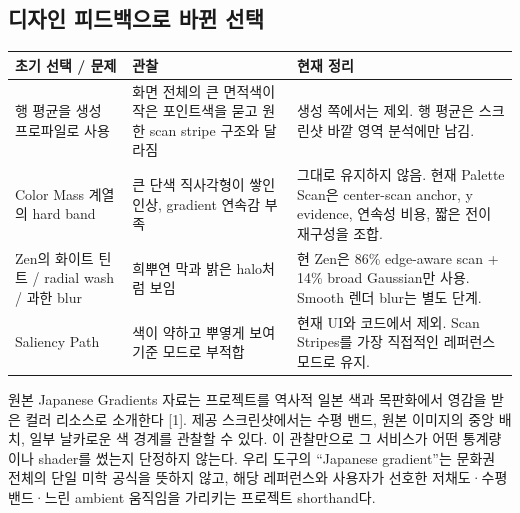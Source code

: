 \documentclass[10pt]{article}
\begin{document}
\subsection*{디자인 피드백으로 바뀐 선택}
\begin{tabularx}{\linewidth}{@{}p{2.9cm}YY@{}}
\toprule
초기 선택 / 문제 & 관찰 & 현재 정리 \\
\midrule
행 평균을 생성 프로파일로 사용 & 화면 전체의 큰 면적색이 작은 포인트색을 묻고 원한 scan stripe 구조와 달라짐 & 생성 쪽에서는 제외. 행 평균은 스크린샷 바깥 영역 분석에만 남김. \\
Color Mass 계열의 hard band & 큰 단색 직사각형이 쌓인 인상, gradient 연속감 부족 & 그대로 유지하지 않음. 현재 Palette Scan은 center-scan anchor, y evidence, 연속성 비용, 짧은 전이 재구성을 조합. \\
Zen의 화이트 틴트 / radial wash / 과한 blur & 희뿌연 막과 밝은 halo처럼 보임 & 현 Zen은 86\% edge-aware scan + 14\% broad Gaussian만 사용. Smooth 렌더 blur는 별도 단계. \\
Saliency Path & 색이 약하고 뿌옇게 보여 기준 모드로 부적합 & 현재 UI와 코드에서 제외. Scan Stripes를 가장 직접적인 레퍼런스 모드로 유지. \\
\bottomrule
\end{tabularx}

원본 Japanese Gradients 자료는 프로젝트를 역사적 일본 색과 목판화에서 영감을 받은 컬러 리소스로 소개한다 [1]. 제공 스크린샷에서는 수평 밴드, 원본 이미지의 중앙 배치, 일부 날카로운 색 경계를 관찰할 수 있다. 이 관찰만으로 그 서비스가 어떤 통계량이나 shader를 썼는지 단정하지 않는다. 우리 도구의 “Japanese gradient”는 문화권 전체의 단일 미학 공식을 뜻하지 않고, 해당 레퍼런스와 사용자가 선호한 저채도·수평 밴드·느린 ambient 움직임을 가리키는 프로젝트 shorthand다.
\end{document}
